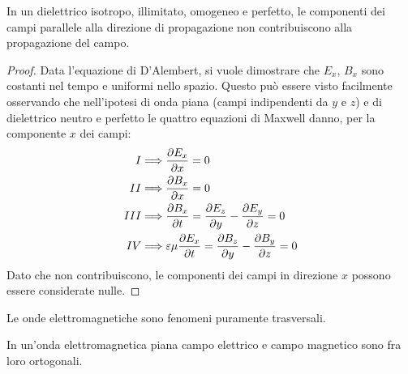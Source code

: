 \begin{lemma}
    In un dielettrico isotropo, illimitato, omogeneo e perfetto, le componenti dei campi parallele alla direzione di
    propagazione non contribuiscono alla propagazione del campo.
\end{lemma}
\begin{proof}
    Data l'equazione di D'Alembert, si vuole dimostrare che $E_x$, $B_x$ sono costanti nel tempo e uniformi nello spazio.
    Questo può essere visto facilmente osservando che nell'ipotesi di onda piana (campi indipendenti da $y$ e $z$) e di dielettrico neutro e perfetto
    le quattro equazioni di Maxwell danno, per la componente $x$ dei campi:
    \[
        \begin{split}
            I   &  \Longrightarrow \pdv{E_x}{x}=0 \\
            II  &  \Longrightarrow \pdv{B_x}{x}=0 \\
            III &  \Longrightarrow \pdv{B_x}{t}=\pdv{E_z}{y}-\pdv{E_y}{z}=0 \\
            IV  &  \Longrightarrow \varepsilon\mu \pdv{E_x}{t}=\pdv{B_z}{y}-\pdv{B_y}{z}=0
        \end{split}
    \]
    Dato che non contribuiscono, le componenti dei campi in direzione $x$ possono essere considerate nulle.
\end{proof}
    Le onde elettromagnetiche sono fenomeni puramente trasversali.

\begin{lemma}
    In un'onda elettromagnetica piana campo elettrico e campo magnetico sono fra loro ortogonali.
\end{lemma}

